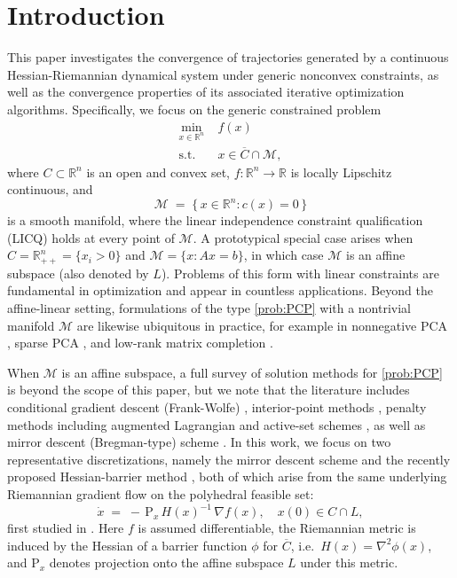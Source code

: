 \documentclass[11pt]{article}
\newcommand{\R}{\mathbb R}
\newcommand{\cM}{\mathcal M}
\begin{document}
\section{Introduction}

This paper investigates the convergence of trajectories generated by a continuous Hessian-Riemannian dynamical system under generic nonconvex constraints, as well as the convergence properties of its associated iterative optimization algorithms. Specifically, we focus on the generic constrained problem
\begin{equation}
\begin{aligned}
\min_{x\in\R^n}\;&f(x)\\
\text{s.t.}\;&x\in\overline C\cap\cM,
\end{aligned}
\label{prob:PCP}
\end{equation}
where \(C\subset\R^n\) is an open and convex set, \(f\colon\R^n\to\R\) is locally Lipschitz continuous, and
\[
\cM \;=\;\{\,x\in\R^n : c(x)=0\,\}
\]
is a smooth manifold, where the linear independence constraint qualification (LICQ) holds at every point of \(\cM\). A prototypical special case arises when \(C=\R^n_{++}=\{x_i>0\}\) and \(\cM=\{x:Ax=b\}\), in which case \(\cM\) is an affine subspace (also denoted by \(L\)). Problems of this form with linear constraints are fundamental in optimization and appear in countless applications.  Beyond the affine-linear setting, formulations of the type \eqref{prob:PCP} with a nontrivial manifold \(\cM\) are likewise ubiquitous in practice, for example in nonnegative PCA \cite{zass2006nonnegative,jiang2023exact}, sparse PCA \cite{zou2006sparse}, and low-rank matrix completion \cite{vandereycken2013low,cambier2016robust}.

When \(\cM\) is an affine subspace, a full survey of solution methods for \eqref{prob:PCP} is beyond the scope of this paper, but we note that the literature includes conditional gradient descent (Frank-Wolfe) \cite{frank1956algorithm,jaggi2013revisiting}, interior-point methods \cite{karmarkar1984new,nesterov1994interior,wright1997primal}, penalty methods \cite{fiacco1968nonlinear,xiao2025exact} including augmented Lagrangian \cite{powell1969method,rockafellar1973dual} and active-set schemes \cite{byrd1999active}, as well as mirror descent (Bregman-type) scheme \cite{nemirovskij1983problem,bauschke2017descent,lu2018relatively,bolte2018first}.  In this work, we focus on two representative discretizations, namely the mirror descent scheme and the recently proposed Hessian-barrier method \cite{bomze2019hessian,dvurechensky2025hessian}, both of which arise from the same underlying Riemannian gradient flow on the polyhedral feasible set:
\[
\dot x \;=\; -\,\mathrm{P}_x\,H(x)^{-1}\,\nabla f(x), 
\quad x(0)\in C\cap L,
\]
first studied in \cite{bolte2003barrier,alvarez2004hessian,attouch2004singular}.  Here \(f\) is assumed differentiable, the Riemannian metric is induced by the Hessian of a barrier function \(\phi\) for \(\overline C\), i.e.\ \(H(x)=\nabla^2\phi(x)\), and \(\mathrm{P}_x\) denotes projection onto the affine subspace \(L\) under this metric.
\end{document}

